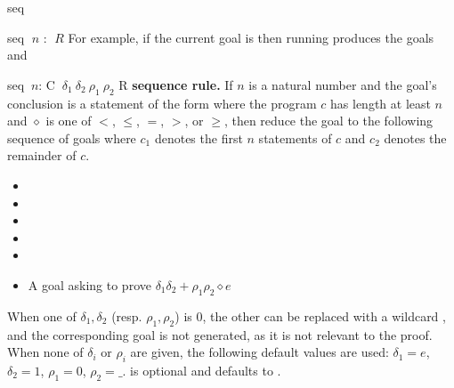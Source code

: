 \begin{tactic}{seq}
\begin{tsyntax}{seq $\;n$ : $\;R$}
  \bigskip
  For example, if the current goal is
   then
  running 
  produces the goals
  and
  \end{tsyntax}

  \begin{tsyntax}{seq $\ n$: C $\ \delta_1\ \delta_2\ \rho_1\ \rho_2$ R}
    \textbf{\phl sequence rule.} If $n$ is a natural number and the
    goal's conclusion is a \phl statement of the form  where the program $c$ has
    length at least $n$ and $\diamond$ is one of $<$, $\leq$, $=$,
    $>$, or $\geq$, then reduce the goal to the following sequence of
    goals where $c_1$ denotes the first $n$ statements of $c$ and
    $c_2$ denotes the remainder of $c$.
    \begin{itemize}
    \item {}
    \item {}
    \item {}
    \item {}
    \item {}
    \item A goal asking to prove $\delta_1 \delta_2 + \rho_1 \rho_2 \mathrel{\diamond} e$
    \end{itemize}
    When one of $\delta_1,\delta_2$ (resp. $\rho_1,\rho_2$) is 0,
    the other can be replaced with a wildcard \ec{_}, and the
    corresponding goal is not generated, as it is not relevant to the
    proof. When none of $\delta_i$ or $\rho_i$ are given, the
    following default values are used: $\delta_1 = e$, $\delta_2 = 1$,
    $\rho_1 = 0$, $\rho_2 = \_$.  is optional and defaults to .



\end{tsyntax}
\end{tactic}
